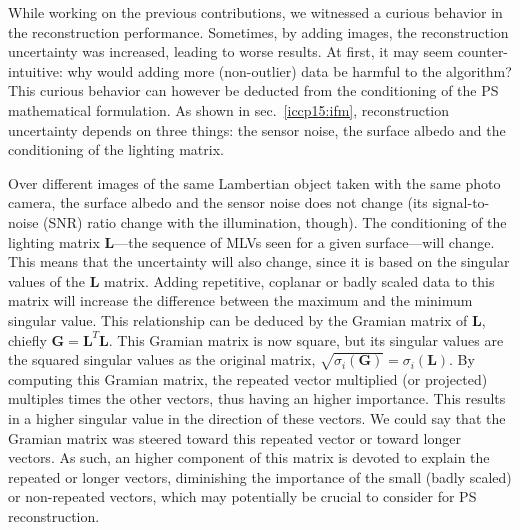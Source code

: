 While working on the previous contributions, we witnessed a curious behavior in the reconstruction performance. Sometimes, by adding images, the reconstruction uncertainty was increased, leading to worse results. At first, it may seem counter-intuitive: why would adding more (non-outlier) data be harmful to the algorithm? This curious behavior can however be deducted from the conditioning of the PS mathematical formulation. As shown in sec.~\ref{iccp15:ifm}, reconstruction uncertainty depends on three things: the sensor noise, the surface albedo and the conditioning of the lighting matrix.

Over different images of the same Lambertian object taken with the same photo camera, the surface albedo and the sensor noise does not change (its signal-to-noise (SNR) ratio change with the illumination, though). The conditioning of the lighting matrix $\mathbf{L}$---the sequence of MLVs seen for a given surface---will change. This means that the uncertainty will also change, since it is based on the singular values of the $\mathbf{L}$ matrix. Adding repetitive, coplanar or badly scaled data to this matrix will increase the difference between the maximum and the minimum singular value. This relationship can be deduced by the Gramian matrix of $\mathbf{L}$, chiefly $\mathbf{G} = \mathbf{L}^T\mathbf{L}$. This Gramian matrix is now square, but its singular values are the squared singular values as the original matrix, $\sqrt{\sigma_i(\mathbf{G})} = \sigma_i(\mathbf{L})$. By computing this Gramian matrix, the repeated vector multiplied (or projected) multiples times the other vectors, thus having an higher importance. This results in a higher singular value in the direction of these vectors. We could say that the Gramian matrix was steered toward this repeated vector or toward longer vectors. As such, an higher component of this matrix is devoted to explain the repeated or longer vectors, diminishing the importance of the small (badly scaled) or non-repeated vectors, which may potentially be crucial to consider for PS reconstruction.


